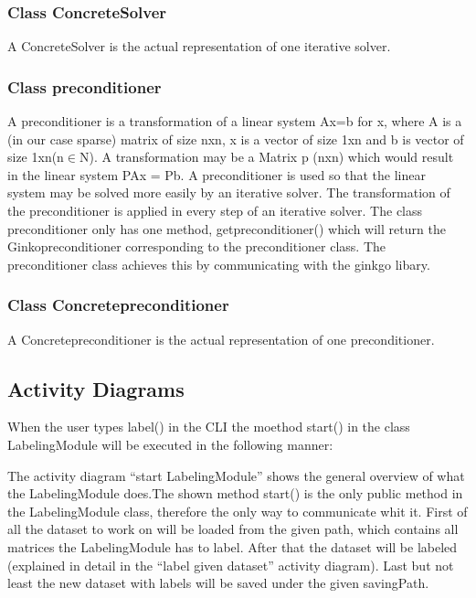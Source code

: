 \documentclass[parskip=full]{scrartcl}
\begin{document}
\subsubsection{Class ConcreteSolver}
A ConcreteSolver is the actual representation of one \gls{iterative solver}.

\subsubsection{Class \gls{preconditioner}}
A \gls{preconditioner} is a transformation of a linear system Ax=b for x, where A is a (in our case sparse) matrix of size nxn, x is a vector of size 1xn and b is vector of size 1xn(n$\in$N). A transformation may be a Matrix p (nxn) which would result in the linear system PAx = Pb. A \gls{preconditioner} is used so that the linear system may be solved more easily by an \gls{iterative solver}. The transformation of the \gls{preconditioner} is applied in every step of an \gls{iterative solver}. \newline\newline
The class \gls{preconditioner} only has one method, get\gls{preconditioner}() which will return the Ginko\gls{preconditioner} corresponding to the \gls{preconditioner} class. The \gls{preconditioner} class achieves this by communicating with the ginkgo libary.

\subsubsection{Class Concrete\gls{preconditioner}}
A Concrete\gls{preconditioner} is the actual representation of one \gls{preconditioner}.

\newpage
\subsection{Activity Diagrams}
When the user types label() in the CLI the moethod start() in the class LabelingModule will be executed in the following manner:

\begin{figure}[h]
\begin{center}

\label{Activity Diagrams}
\end{center}
\end{figure}
\newpage


The activity diagram ``start LabelingModule'' shows the general overview of what the LabelingModule does.The shown method start() is the only public method in the LabelingModule class, therefore the only way to communicate whit it.
First of all the dataset to work on will be loaded from the given path, which contains all matrices the LabelingModule has to label.
After that the dataset will be labeled (explained in detail in the ``label given dataset'' activity diagram).
Last but not least the new dataset with \glspl{label} will be saved under the given savingPath.
\end{document}
